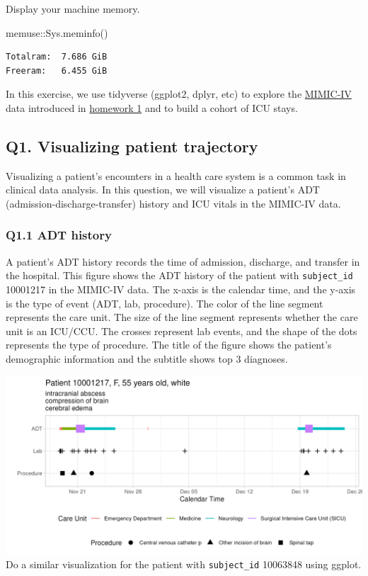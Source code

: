 \documentclass[
]{article}
\newenvironment{Shaded}{\begin{snugshade}}{\end{snugshade}}
\newcommand{\FunctionTok}[1]{\textcolor[rgb]{0.00,0.00,0.00}{#1}}
\newcommand{\NormalTok}[1]{\textcolor[rgb]{0.00,0.00,0.00}{#1}}
\newcommand{\SpecialCharTok}[1]{\textcolor[rgb]{0.00,0.00,0.00}{#1}}
\begin{document}
Display your machine memory.

\begin{Shaded}
\begin{Highlighting}[]
\NormalTok{memuse}\SpecialCharTok{::}\FunctionTok{Sys.meminfo}\NormalTok{()}
\end{Highlighting}
\end{Shaded}

\begin{verbatim}
Totalram:  7.686 GiB 
Freeram:   6.455 GiB 
\end{verbatim}

In this exercise, we use tidyverse (ggplot2, dplyr, etc) to explore the
\href{https://physionet.org/content/mimiciv/3.1/}{MIMIC-IV} data
introduced in
\href{https://ucla-biostat-203b.github.io/2025winter/hw/hw1/hw1.html}{homework
1} and to build a cohort of ICU stays.

\hypertarget{q1.-visualizing-patient-trajectory}{%
\subsection{Q1. Visualizing patient
trajectory}\label{q1.-visualizing-patient-trajectory}}

Visualizing a patient's encounters in a health care system is a common
task in clinical data analysis. In this question, we will visualize a
patient's ADT (admission-discharge-transfer) history and ICU vitals in
the MIMIC-IV data.

\hypertarget{q1.1-adt-history}{%
\subsubsection{Q1.1 ADT history}\label{q1.1-adt-history}}

A patient's ADT history records the time of admission, discharge, and
transfer in the hospital. This figure shows the ADT history of the
patient with \texttt{subject\_id} 10001217 in the MIMIC-IV data. The
x-axis is the calendar time, and the y-axis is the type of event (ADT,
lab, procedure). The color of the line segment represents the care unit.
The size of the line segment represents whether the care unit is an
ICU/CCU. The crosses represent lab events, and the shape of the dots
represents the type of procedure. The title of the figure shows the
patient's demographic information and the subtitle shows top 3
diagnoses.

\includegraphics{images/10001217_adt.png} Do a similar visualization for
the patient with \texttt{subject\_id} 10063848 using ggplot.
\end{document}
